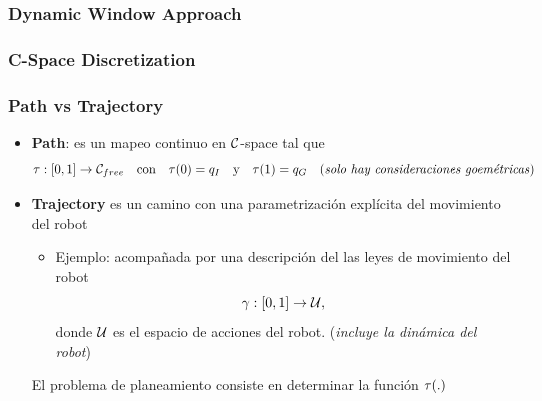 \begin{frame}
    \frametitle{Dynamic Window Approach}
    
    
    
    
\end{frame}

\begin{frame}
    \frametitle{C-Space Discretization}
    
    
    
    
\end{frame}


\begin{frame}
    \frametitle{Path vs Trajectory}
    
    \begin{itemize}
    \item {\bf Path}: es un mapeo continuo en $\mathcal{C}$-space tal que
        \begin{equation*}
            \tau : [0,1] \rightarrow \mathcal{C}_{free} \quad \text{con} \quad \tau(0) = q_{I} \quad \text{y} \quad  \tau(1) = q_{G} \quad \text{(\emph{solo hay consideraciones goemétricas})}
        \end{equation*} 
    \item {\bf Trajectory} es un camino con una parametrización explícita del movimiento del robot
    \begin{itemize}
        \item Ejemplo: acompañada por una descripción del las leyes de movimiento del robot
            \begin{equation*}
                \gamma : [0, 1] \rightarrow \mathcal{U},
            \end{equation*}
            donde $\mathcal{U}$ es el espacio de acciones del robot. (\emph{incluye la dinámica del robot})
        \end{itemize}
        \vspace{3em}
        \begin{center}
            \alert{El problema de planeamiento consiste en determinar la función $\tau(.)$}  
        \end{center}
    \end{itemize}
\end{frame}

